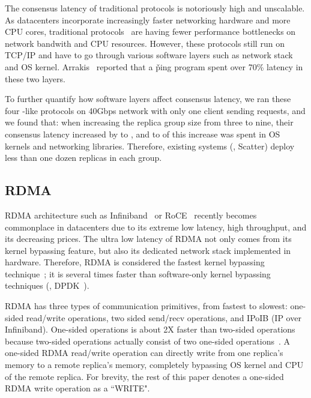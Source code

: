 The consensus latency of traditional \paxos protocols is notoriously high and 
unscalable. As datacenters incorporate increasingly faster networking hardware 
and more CPU cores, traditional 
\paxos protocols~\cite{libpaxos,spaxos,crane,rex:eurosys14,zookeeper} are 
having fewer performance bottlenecks on network bandwith and CPU resources. 
However, these protocols still run on TCP/IP and have to go through various 
software layers such as network stack and OS kernel. 
Arrakis~\cite{arrakis:osdi14} reported that a \v{ping} program spent over 70\% 
latency in these two layers.

To further quantify how software layers affect \paxos consensus latency, 
we ran these four \paxos-like protocols on 40Gbps network with only one client 
sending requests, and we found that: when increasing the replica group size from 
three to nine, their consensus latency increased by \tradlatencyincreaselow to 
\tradlatencyincreasehigh, and \systemcostlow to \systemcosthigh of this increase 
was spent in OS kernels and networking libraries. Therefore, existing systems 
(\eg, Scatter) deploy less than one dozen replicas in each \paxos group.




\subsection{RDMA}\label{sec:rdma}
RDMA architecture such as Infiniband~\cite{infiniband} or RoCE~\cite{roce} 
recently becomes commonplace in datacenters due to its extreme low latency, 
high throughput, and its decreasing prices. The ultra low latency of RDMA not 
only comes from its kernel bypassing feature, but also its dedicated network 
stack implemented in hardware. Therefore, RDMA is considered the fastest kernel 
bypassing technique~\cite{herd:sigcomm14,pilaf:usenix14,dare:hpdc15}; it is 
several times faster than software-only kernel bypassing techniques (\eg, 
DPDK~\cite{dpdk}).

RDMA has three types of communication primitives, from fastest to 
slowest: one-sided read/write operations, two sided send/recv operations, and 
IPoIB (IP over Infiniband). One-sided operations is about 2X faster than 
two-sided operations because two-sided operations actually consist of two 
one-sided operations~\cite{pilaf:usenix14}. A one-sided RDMA read/write 
operation can directly write from one replica's memory to a remote replica's 
memory, completely bypassing OS kernel and CPU of the remote replica. For 
brevity, the rest of this paper denotes a one-sided RDMA write operation as a 
``WRITE".


